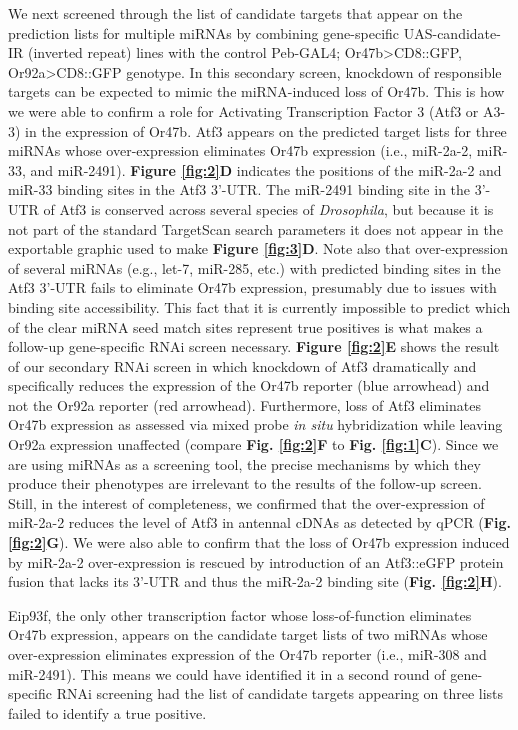 We next screened through the list of candidate targets that appear on the prediction lists for multiple miRNAs by combining gene-specific UAS-candidate-IR (inverted repeat) lines with the control Peb-GAL4; Or47b\textgreater{}CD8::GFP, Or92a\textgreater{}CD8::GFP genotype.
In this secondary screen, knockdown of responsible targets can be expected to mimic the miRNA-induced loss of Or47b.
This is how we were able to confirm a role for Activating Transcription Factor 3 (Atf3 or A3-3) in the expression of Or47b.
Atf3 appears on the predicted target lists for three miRNAs whose over-expression eliminates Or47b expression (i.e., miR-2a-2, miR-33, and miR-2491).
\textbf{Figure \ref{fig:2}D} indicates the positions of the miR-2a-2 and miR-33 binding sites in the Atf3 3'-UTR.
The miR-2491 binding site in the 3'-UTR of Atf3 is conserved across several species of \emph{Drosophila}, but because it is not part of the standard TargetScan search parameters it does not appear in the exportable graphic used to make \textbf{Figure \ref{fig:3}D}.
Note also that over-expression of several miRNAs (e.g., let-7, miR-285, etc.) with predicted binding sites in the Atf3 3'-UTR fails to eliminate Or47b expression, presumably due to issues with binding site accessibility.
This fact that it is currently impossible to predict which of the clear miRNA seed match sites represent true positives is what makes a follow-up gene-specific RNAi screen necessary.
\textbf{Figure \ref{fig:2}E} shows the result of our secondary RNAi screen in which knockdown of Atf3 dramatically and specifically reduces the expression of the Or47b reporter (blue arrowhead) and not the Or92a reporter (red arrowhead).
Furthermore, loss of Atf3 eliminates Or47b expression as assessed via mixed probe \emph{in situ} hybridization while leaving Or92a expression unaffected (compare \textbf{Fig. \ref{fig:2}F} to \textbf{Fig. \ref{fig:1}C}).
Since we are using miRNAs as a screening tool, the precise mechanisms by which they produce their phenotypes are irrelevant to the results of the follow-up screen.
Still, in the interest of completeness, we confirmed that the over-expression of miR-2a-2 reduces the level of Atf3 in antennal cDNAs as detected by qPCR (\textbf{Fig. \ref{fig:2}G}).
We were also able to confirm that the loss of Or47b expression induced by miR-2a-2 over-expression is rescued by introduction of an Atf3::eGFP protein fusion that lacks its 3'-UTR and thus the miR-2a-2 binding site (\textbf{Fig. \ref{fig:2}H}).

Eip93f, the only other transcription factor whose loss-of-function eliminates Or47b expression, appears on the candidate target lists of two miRNAs whose over-expression eliminates expression of the Or47b reporter (i.e., miR-308 and miR-2491).
This means we could have identified it in a second round of gene-specific RNAi screening had the list of candidate targets appearing on three lists failed to identify a true positive.
